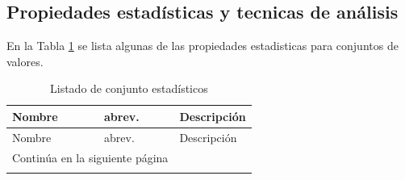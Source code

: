\subsection{Propiedades estadísticas y tecnicas de análisis}
En la Tabla \ref{tab-stats} se lista algunas de las propiedades estadisticas para conjuntos de valores.
\begin{longtable}{|m{7em}|m{5em}|m{20em}|}
    \caption{Listado de conjunto estadísticos} 
    \label{tab-stats} \\
    \hline
    \rowcolor[gray]{0.8}
    Nombre & abrev. & Descripción \\
    \hline
    \endfirsthead
    
    \hline
    \rowcolor[gray]{0.8}
    Nombre & abrev. & Descripción \\
    \hline
    \endhead
    
    \hline \multicolumn{2}{|r|}{{Continúa en la siguiente página}} \\ \hline
    \endfoot
    

\end{longtable}
